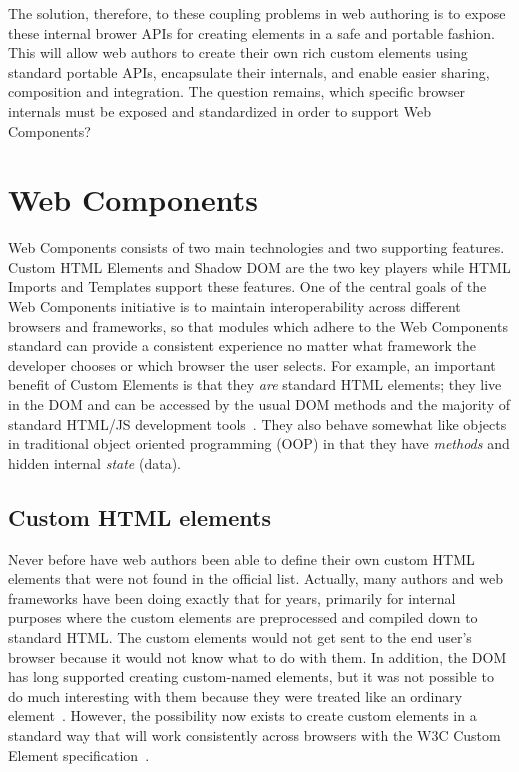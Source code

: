 The solution, therefore, to these coupling problems in web authoring is to expose these internal brower APIs for creating elements in a safe and portable fashion. 
This will allow web authors to create their own rich custom elements using standard portable APIs, encapsulate their internals, and enable easier sharing, composition and integration.
The question remains, which specific browser internals must be exposed and standardized in order to support Web Components?

\section{Web Components}

Web Components consists of two main technologies and two supporting features. 
Custom HTML Elements and Shadow DOM are the two key players while HTML Imports and Templates support these features. 
One of the central goals of the Web Components initiative is to maintain interoperability across different browsers and frameworks, 
so that modules which adhere to the Web Components standard can provide a consistent experience no matter what framework the developer chooses or which browser the user selects.
For example, an important benefit of Custom Elements is that they \textit{are} standard HTML elements; they live in the DOM and can be accessed by the usual DOM methods and the majority of standard HTML/JS development tools~\cite{penades2015}.
They also behave somewhat like objects in traditional object oriented programming (OOP) in that 
they have \textit{methods} and hidden internal \textit{state} (data).

\subsection{Custom HTML elements}
Never before have web authors been able to define their own custom HTML elements that were not found in the official list.
Actually, many authors and web frameworks have been doing exactly that for years, primarily for internal purposes where the custom elements are pre\-processed and compiled down to standard HTML.
The custom elements would not get sent to the end user's browser because it would not know what to do with them.
In addition, the DOM has long supported creating custom-named elements, but it was not possible to do much interesting with them because they were treated like an ordinary 
 element~\cite{w3ccontributors2015-b}.
However, the possibility now exists to create custom elements in a standard way that will work consistently across browsers with the W3C Custom Element
specification~\cite{w3ccontributors2015-b}. 

